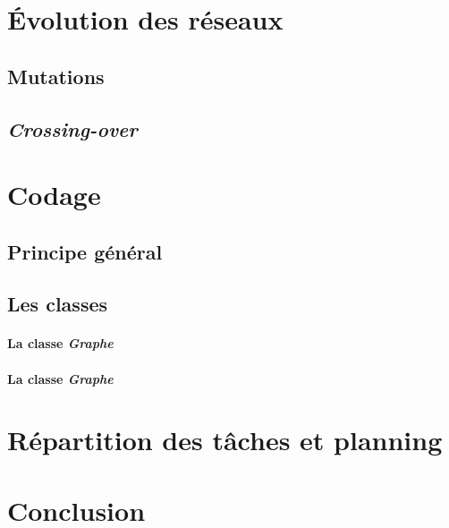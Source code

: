 \section{\'Evolution des réseaux}

\subsection{Mutations}

\subsection{\textit{Crossing-over}}


\section{Codage}

\subsection{Principe général}

\subsection{Les classes}
\paragraph*{La classe \textit{Graphe}\\}

\paragraph*{La classe \textit{Graphe}\\}


\section{Répartition des tâches et planning}


\section{Conclusion}

